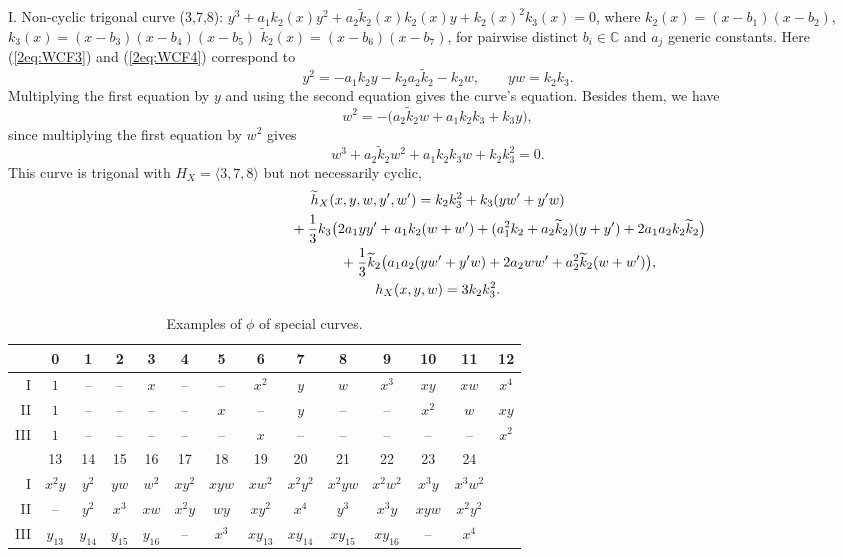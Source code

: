 \documentclass[10pt,a4paper]{amsart}
\def\CC{{\mathbb C}}
\def\th{{\widetilde h}}
\def\tk{{\widetilde k}}
\numberwithin{equation}{section}
\begin{document}
I. Non-cyclic trigonal curve (3,7,8):
$y^3 + a_1 k_2(x) y^2
+ a_2\tk_2(x) k_2(x) y +k_2(x)^2 k_3(x)=0$,
where $k_2(x) = (x-b_1)(x-b_2)$,
$k_3(x) = (x-b_3)(x-b_4)(x-b_5)$
$\tk_2(x) = (x-b_6)(x-b_7)$, for pairwise distinct $b_i\in \CC$ and $a_j$ generic constants.
Here (\ref{2eq:WCF3}) and (\ref{2eq:WCF4}) correspond to
\[
y^2 = -a_1k_2 y - k_2 a_2\tk_2 - k_2 w, \qquad
y w = k_2 k_3.
\]
Multiplying the first equation by $y$ and using the second equation gives the curve's equation.
Besides them, we have
\[
w^2 = -\big( a_2\tk_2 w + a_1k_2 k_3 + k_3y\big),
\]
since multiplying the first equation by $w^2$ gives
\[
w^3 + a_2\tk_2 w^2 + a_1k_2 k_3 w + k_2 k_3^2=0.
\]
This curve is trigonal with $H_X=\langle 3,7,8\rangle$ but not necessarily cyclic,
\begin{gather*}
\th_X(x, y, w, y', w')=k_2 k_3^2 + k_3(y w'+ y' w)\\
\hphantom{\th_X(x, y, w, y', w')=}{} + \frac{1}{3} k_3\big(2 a_1 y y'+a_1 k_2 (w+w')+(a_1^2k_2+a_2 \tk_2)(y+y')+2a_1a_2k_2 \tk_2\big)\\
\hphantom{\th_X(x, y, w, y', w')=}{} + \frac{1}{3}\tk_2\big(a_1a_2( y w'+y' w)+2a_2w w'+a_2^2 \tk_2(w+w')\big),\\
h_X(x,y, w) = 3k_2 k_3^2.
\end{gather*}

\begin{table}[t]\centering
	\caption{Examples of $\phi$ of special curves.}\vspace{1mm}
\renewcommand{\arraystretch}{1.3}\small
 \begin{tabular}{|r|ccccccccccccc|}
\hline
 &0&1&2&3&4&5&6&7&8&9&10&11&12\\
\hline
I&$1$&--&--&$x$&--&--&$x^2$&$y$&$w$&$x^3$&$xy$&$xw$&
 $x^4$\\
II&$1$&--&--&--&--&$x$&--&$y$&--&--&$x^2$&$w$&$xy$\\
III&$1$&--&--&--&--&--&$x$&--&--&--&--&--&$x^2$\\
\hline
\hline
&13&14&15&16& 17&18&19&20&21&22&23&24&\\
\hline
I&$x^2y$&$y^2$&$yw$&$w^2$&$xy^2$&$xyw$&$xw^2$&$x^2y^2$&
 $x^2yw$&$x^2w^2$&$x^3y$&$x^3w^2$&\\
II&--&$y^2$&$x^3$&$xw$&$x^2y$&$wy$&$xy^2$&$x^4$&$y^3$&$x^3y$&$xyw$&$x^2y^2$&\\
III&$y_{13}$&$y_{14}$&$y_{15}$&$y_{16}$
 &--&$x^3$&$xy_{13}$&$xy_{14}$&$xy_{15}$&$xy_{16}$&--&$x^4$&\\
\hline
 \end{tabular}
\end{table}
\end{document}

